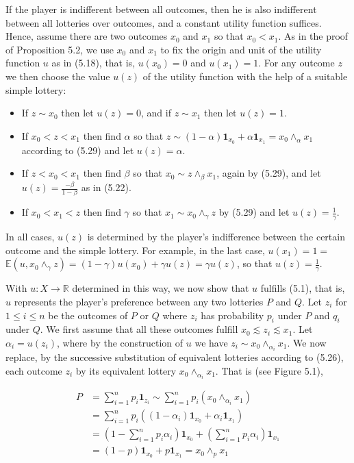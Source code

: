 \documentclass[12pt]{article}
\begin{document}
If the player is indifferent between all outcomes, then he is also indifferent between all lotteries over outcomes, and a constant utility function suffices. Hence, assume there are two outcomes $x_{0}$ and $x_{1}$ so that $x_{0}<x_{1}$. As in the proof of Proposition 5.2, we use $x_{0}$ and $x_{1}$ to fix the origin and unit of the utility function $u$ as in (5.18), that is, $u\left(x_{0}\right)=0$ and $u\left(x_{1}\right)=1$. For any outcome $z$ we then choose the value $u(z)$ of the utility function with the help of a suitable simple lottery:

\begin{itemize}
  \item If $z \sim x_{0}$ then let $u(z)=0$, and if $z \sim x_{1}$ then let $u(z)=1$.
  \item If $x_{0}<z<x_{1}$ then find $\alpha$ so that $z \sim(1-\alpha) \mathbf{1}_{x_{0}}+\alpha \mathbf{1}_{x_{1}}=x_{0} \wedge_{\alpha} x_{1}$ according to (5.29) and let $u(z)=\alpha$.
  \item If $z<x_{0}<x_{1}$ then find $\beta$ so that $x_{0} \sim z \wedge_{\beta} x_{1}$, again by (5.29), and let $u(z)=\frac{-\beta}{1-\beta}$ as in (5.22).
  \item If $x_{0}<x_{1}<z$ then find $\gamma$ so that $x_{1} \sim x_{0} \wedge_{\gamma} z$ by (5.29) and let $u(z)=\frac{1}{\gamma}$.
\end{itemize}

In all cases, $u(z)$ is determined by the player's indifference between the certain outcome and the simple lottery. For example, in the last case, $u\left(x_{1}\right)=1=$ $\mathbb{E}\left(u, x_{0} \wedge_{\gamma} z\right)=(1-\gamma) u\left(x_{0}\right)+\gamma u(z)=\gamma u(z)$, so that $u(z)=\frac{1}{\gamma}$.

With $u: X \rightarrow \mathbb{R}$ determined in this way, we now show that $u$ fulfills (5.1), that is, $u$ represents the player's preference between any two lotteries $P$ and $Q$. Let $z_{i}$ for $1 \leq i \leq n$ be the outcomes of $P$ or $Q$ where $z_{i}$ has probability $p_{i}$ under $P$ and $q_{i}$ under $Q$. We first assume that all these outcomes fulfill $x_{0} \lesssim z_{i} \lesssim x_{1}$. Let $\alpha_{i}=u\left(z_{i}\right)$, where by the construction of $u$ we have $z_{i} \sim x_{0} \wedge_{\alpha_{i}} x_{1}$. We now replace, by the successive substitution of equivalent lotteries according to (5.26), each outcome $z_{i}$ by its equivalent lottery $x_{0} \wedge_{\alpha_{i}} x_{1}$. That is (see Figure 5.1),


\begin{align*}
P & =\sum_{i=1}^{n} p_{i} \mathbf{1}_{z_{i}} \sim \sum_{i=1}^{n} p_{i}\left(x_{0} \wedge_{\alpha_{i}} x_{1}\right) \\
& =\sum_{i=1}^{n} p_{i}\left(\left(1-\alpha_{i}\right) \mathbf{1}_{x_{0}}+\alpha_{i} \mathbf{1}_{x_{1}}\right) \\
& =\left(1-\sum_{i=1}^{n} p_{i} \alpha_{i}\right) \mathbf{1}_{x_{0}}+\left(\sum_{i=1}^{n} p_{i} \alpha_{i}\right) \mathbf{1}_{x_{1}} \\
& =(1-p) \mathbf{1}_{x_{0}}+p \mathbf{1}_{x_{1}}=x_{0} \wedge_{p} x_{1} \tag{5.32}
\end{align*}
\end{document}
